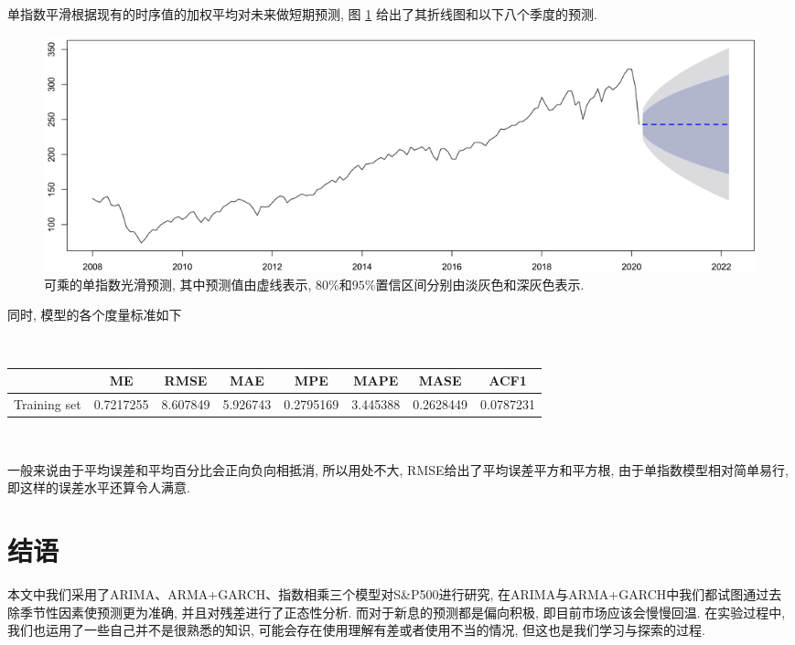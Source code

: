 \documentclass[11pt]{article}
\begin{document}
\qquad 单指数平滑根据现有的时序值的加权平均对未来做短期预测, 图 \ref{fig:21} 给出了其折线图和以下八个季度的预测. 
\begin{figure}
    \centering
    \hspace{-30pt}\includegraphics[width=.8\textwidth]{output_62_0}
    \caption{\footnotesize 可乘的单指数光滑预测, 其中预测值由虚线表示, $80\%$和$95\%$置信区间分别由淡灰色和深灰色表示.\label{fig:21}}
\end{figure}

\vspace{-10pt}\qquad 同时, 模型的各个度量标准如下

\ 

\begin{center}
\begin{tabular}{r|ccccccc}
  & ME & RMSE & MAE & MPE & MAPE & MASE & ACF1\\
\hline
	Training set & 0.7217255 & 8.607849 & 5.926743 & 0.2795169 & 3.445388 & 0.2628449 & 0.0787231\\
\end{tabular}
\normalsize
\end{center}

\ 

\qquad 一般来说由于平均误差和平均百分比会正向负向相抵消, 所以用处不大, RMSE给出了平均误差平方和平方根, 由于单指数模型相对简单易行, 即这样的误差水平还算令人满意. 
\section{结语}
\qquad 本文中我们采用了ARIMA、ARMA+GARCH、指数相乘三个模型对S\&P500进行研究, 在ARIMA与ARMA+GARCH中我们都试图通过去除季节性因素使预测更为准确, 并且对残差进行了正态性分析. 而对于新息的预测都是偏向积极, 即目前市场应该会慢慢回温. 在实验过程中, 我们也运用了一些自己并不是很熟悉的知识, 可能会存在使用理解有差或者使用不当的情况, 但这也是我们学习与探索的过程. 
\end{document}

